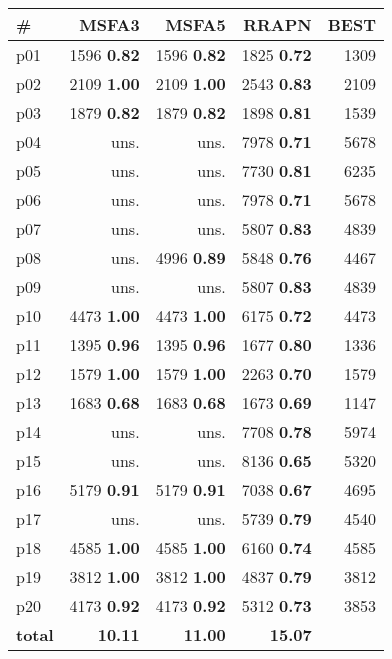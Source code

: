 \begin{tabular}{|l|rrr|r|}
\hline
\textbf{\#} & \textbf{MSFA3} & \textbf{MSFA5} & \textbf{RRAPN} & \textbf{BEST}\\
\hline
p01 & {\footnotesize 1596} \textbf{0.82} & {\footnotesize 1596} \textbf{0.82} & {\footnotesize 1825} \textbf{0.72} & 1309\\
p02 & {\footnotesize 2109} \textbf{1.00} & {\footnotesize 2109} \textbf{1.00} & {\footnotesize 2543} \textbf{0.83} & 2109\\
p03 & {\footnotesize 1879} \textbf{0.82} & {\footnotesize 1879} \textbf{0.82} & {\footnotesize 1898} \textbf{0.81} & 1539\\
p04 & uns. & uns. & {\footnotesize 7978} \textbf{0.71} & 5678\\
p05 & uns. & uns. & {\footnotesize 7730} \textbf{0.81} & 6235\\
p06 & uns. & uns. & {\footnotesize 7978} \textbf{0.71} & 5678\\
p07 & uns. & uns. & {\footnotesize 5807} \textbf{0.83} & 4839\\
p08 & uns. & {\footnotesize 4996} \textbf{0.89} & {\footnotesize 5848} \textbf{0.76} & 4467\\
p09 & uns. & uns. & {\footnotesize 5807} \textbf{0.83} & 4839\\
p10 & {\footnotesize 4473} \textbf{1.00} & {\footnotesize 4473} \textbf{1.00} & {\footnotesize 6175} \textbf{0.72} & 4473\\
p11 & {\footnotesize 1395} \textbf{0.96} & {\footnotesize 1395} \textbf{0.96} & {\footnotesize 1677} \textbf{0.80} & 1336\\
p12 & {\footnotesize 1579} \textbf{1.00} & {\footnotesize 1579} \textbf{1.00} & {\footnotesize 2263} \textbf{0.70} & 1579\\
p13 & {\footnotesize 1683} \textbf{0.68} & {\footnotesize 1683} \textbf{0.68} & {\footnotesize 1673} \textbf{0.69} & 1147\\
p14 & uns. & uns. & {\footnotesize 7708} \textbf{0.78} & 5974\\
p15 & uns. & uns. & {\footnotesize 8136} \textbf{0.65} & 5320\\
p16 & {\footnotesize 5179} \textbf{0.91} & {\footnotesize 5179} \textbf{0.91} & {\footnotesize 7038} \textbf{0.67} & 4695\\
p17 & uns. & uns. & {\footnotesize 5739} \textbf{0.79} & 4540\\
p18 & {\footnotesize 4585} \textbf{1.00} & {\footnotesize 4585} \textbf{1.00} & {\footnotesize 6160} \textbf{0.74} & 4585\\
p19 & {\footnotesize 3812} \textbf{1.00} & {\footnotesize 3812} \textbf{1.00} & {\footnotesize 4837} \textbf{0.79} & 3812\\
p20 & {\footnotesize 4173} \textbf{0.92} & {\footnotesize 4173} \textbf{0.92} & {\footnotesize 5312} \textbf{0.73} & 3853\\
\hline
\textbf{total} & \textbf{10.11} & \textbf{11.00} & \textbf{15.07} & \\
\hline
\end{tabular}


